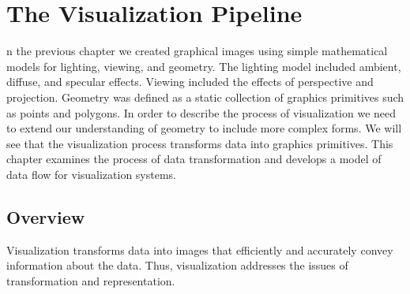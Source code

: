 \chapter{The Visualization Pipeline}
\label{chap:visualization_pipeline}

n the previous chapter we created graphical images using simple mathematical models for lighting, viewing, and geometry.
The lighting model included ambient, diffuse, and specular effects.
Viewing included the effects of perspective and projection.
Geometry was defined as a static collection of graphics primitives such as points and polygons.
In order to describe the process of visualization we need to extend our understanding of geometry to include more complex forms.
We will see that the visualization process transforms data into graphics primitives.
This chapter examines the process of data transformation and develops a model of data flow for visualization systems.

\section {Overview}
Visualization transforms data into images that efficiently and accurately convey information about
the data. Thus, visualization addresses the issues of transformation and representation.
